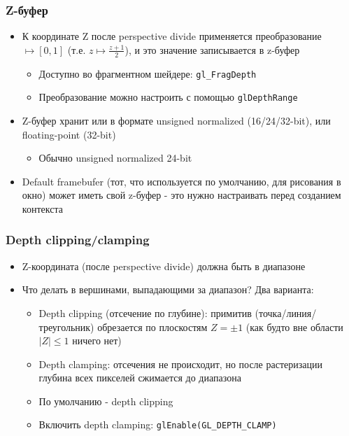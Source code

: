 \documentclass{beamer}
\begin{document}
\begin{frame}[fragile]
\frametitle{Z-буфер}
\begin{itemize}
\item К координате Z после perspective divide применяется преобразование \begin{math}[-1, 1] \mapsto [0, 1]\end{math} (т.е. \begin{math}z \mapsto \frac{z+1}{2}\end{math}), и это значение записывается в z-буфер
\pause
\begin{itemize}
\item Доступно во фрагментном шейдере: \verb|gl_FragDepth|
\pause
\item Преобразование можно настроить с помощью \verb|glDepthRange|
\end{itemize}
\pause
\item Z-буфер хранит или в формате unsigned normalized (16/24/32-bit), или floating-point (32-bit)
\begin{itemize}
\item Обычно unsigned normalized 24-bit
\end{itemize}
\pause
\item Default framebufer (тот, что используется по умолчанию, для рисования в окно) может иметь свой z-буфер - это нужно настраивать перед созданием контекста
\end{itemize}
\end{frame}

\begin{frame}[fragile]
\frametitle{Depth clipping/clamping}
\begin{itemize}
\item Z-координата (после perspective divide) должна быть в диапазоне \begin{math}[-1, 1]\end{math}
\pause
\item Что делать в вершинами, выпадающими за диапазон? Два варианта:
\pause
\begin{itemize}
\item Depth clipping (отсечение по глубине): примитив (точка/линия/треугольник) обрезается по плоскостям \begin{math}Z = \pm 1\end{math} (как будто вне области \begin{math}|Z|\leq 1\end{math} ничего нет)
\pause
\item Depth clamping: отсечения не происходит, но после растеризации глубина всех пикселей сжимается до диапазона \begin{math}[-1, 1]\end{math}
\pause
\item По умолчанию - depth clipping
\item Включить depth clamping: \verb|glEnable(GL_DEPTH_CLAMP)|
\end{itemize}
\end{itemize}
\end{frame}
\end{document}
